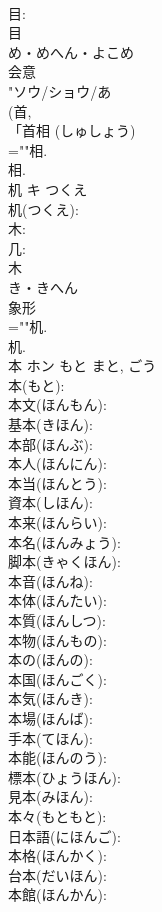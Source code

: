 \documentclass[8pt]{extreport}
\begin{document}
\begin{CJK}{UTF8}{min}
\\	目: 
\\	目	
\\	め・めへん・よこめ	
\\	会意 
\\	"ソウ/ショウ/あ 
\\	(首, 
\\	「首相 (しゅしょう)
\\	=""相.
\\	相.
\\	机	キ	つくえ		
\\	机(つくえ): 
\\	木: 
\\	几: 
\\	木	
\\	き・きへん	
\\	象形 
\\	=""机.
\\	机.
\\	本	ホン	もと	まと, ごう	
\\	本(もと): 
\\	本文(ほんもん): 
\\	基本(きほん): 
\\	本部(ほんぶ): 
\\	本人(ほんにん): 
\\	本当(ほんとう): 
\\	資本(しほん): 
\\	本来(ほんらい): 
\\	本名(ほんみょう): 
\\	脚本(きゃくほん): 
\\	本音(ほんね): 
\\	本体(ほんたい): 
\\	本質(ほんしつ): 
\\	本物(ほんもの): 
\\	本の(ほんの): 
\\	本国(ほんごく): 
\\	本気(ほんき): 
\\	本場(ほんば): 
\\	手本(てほん): 
\\	本能(ほんのう): 
\\	標本(ひょうほん): 
\\	見本(みほん): 
\\	本々(もともと): 
\\	日本語(にほんご): 
\\	本格(ほんかく): 
\\	台本(だいほん): 
\\	本館(ほんかん): 

\end{CJK}
\end{document}
